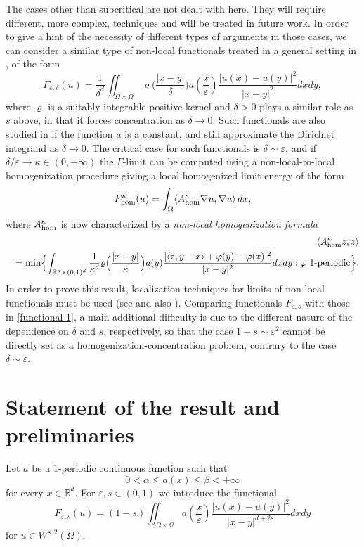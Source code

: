\documentclass[11pt,a4paper,reqno]{amsart}
\theoremstyle{plain}
\theoremstyle{definition}
\newcommand\e{\varepsilon}
\newcommand\R{\mathbb{R}}    %
\theoremstyle{remark}
\begin{document}
The cases other than subcritical are not dealt with here. They will require different, more complex, techniques and will be treated in future work. In order to give a hint of the necessity of different types of arguments in those cases, we can consider a similar type of non-local functionals treated in a general setting in 
 \cite{AABPT}, of the form 
\begin{equation}\label{functional-1}
    F_{\varepsilon,\delta}(u)=\frac{1}{\delta^d}\iint_{\Omega\times \Omega} \varrho\Big(\frac{|x-y|}{\delta}\Bigr)a\left(\frac{x}{\varepsilon}\right)\frac{\lvert u(x)-u(y)\rvert^2}{\lvert x-y\rvert^{2}}dxdy,
\end{equation}
where $\varrho$ is a suitably integrable positive kernel
and $\delta>0$ plays a similar role as $s$ above, in that it forces concentration as $\delta\to0$.
Such functionals are also studied in \cite{bbm} if the function $a$ is a constant, and still approximate the Dirichlet integrand as $\delta\to0$. The critical case for such functionals is $\delta\sim\e$, and if $\delta/\e\to \kappa\in(0,+\infty)$ the $\Gamma$-limit can be computed using a non-local-to-local homogenization procedure giving a local homogenized limit energy of the form
$$
F^\kappa_{\rm hom}(u)=\int_\Omega\langle A^\kappa_{\rm hom}\nabla u,\nabla u\rangle\,dx,
$$
where $A^\kappa_{\rm hom}$ is now characterized by a {\em non-local homogenization formula}
\begin {eqnarray*}
&&\hskip-.5cm\langle A^\kappa_{\rm hom}z,z\rangle\\
&&=\min\Bigl\{\int_{\mathbb R^d\times (0,1)^d} \frac{1}{\kappa^d}\varrho\Bigl(\frac{|x-y|}{\kappa}\Bigr) a(y)\frac{|\langle z,y-x\rangle+\varphi(y)-\varphi(x)|^2}{|x-y|^2}dxdy: \varphi\  1\hbox{-periodic}\Bigr\}.
\end{eqnarray*}
In order to prove this result, localization techniques for limits of non-local functionals must be used (see \cite{AABPT} and also \cite{BP}). Comparing  functionals $F_{\e,s}$ with those in \eqref{functional-1}, a main additional difficulty is due to the different nature of the dependence on $\delta$ and $s$, respectively, so that the case $1-s\sim \e^2$ cannot be directly set as a homogenization-concentration problem, contrary to the case $\delta\sim\e$.

\section{Statement of the result and preliminaries}
Let $a$ be a $1$-periodic continuous function such that 
\begin{equation}\label{eq:bounds}
0<\alpha \leq a(x) \leq \beta<+\infty
\end{equation}
for every $x\in\R^d$. For $\e,s\in(0,1)$ we introduce the functional 
\begin{equation}\label{functional}
    F_{\varepsilon,s}(u)=(1-s)\iint_{\Omega\times \Omega} a\left(\frac{x}{\varepsilon}\right)\frac{\lvert u(x)-u(y)\rvert^2}{\lvert x-y\rvert^{d+2s}}dxdy
\end{equation}
 for $u\in W^{s,2}(\Omega)$.
\end{document}
